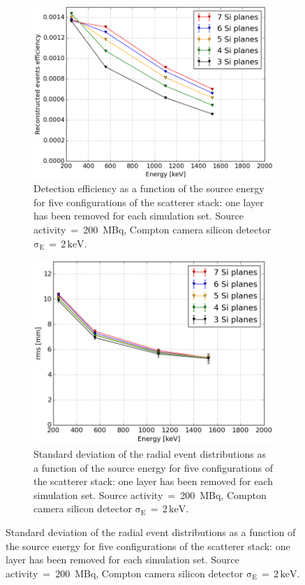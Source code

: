 \begin{figure}[h!]
\begin{subfigure}[t]{0.5\textwidth}
\centering
\includegraphics[width=.95\linewidth]{03_GraphicFiles/chapter5_SPECTsimu/SPECT/compton/geometry/effVSenergy_NSiplanes.png}
\caption{Detection efficiency as a function of the source energy for five configurations of the scatterer stack: one layer has been removed for each simulation set. Source activity~=~200~MBq, Compton camera silicon detector $\mathrm{\sigma_{E}\,=\,2\,keV}$.}
\label{chap5::fig::design_eff}
\end{subfigure}  
\begin{subfigure}[t]{.5\textwidth}
\centering
  \includegraphics[width=.95\linewidth]{03_GraphicFiles/chapter5_SPECTsimu/SPECT/compton/geometry/rmsVSenergy_NSiplanes.png}
  \caption{Standard deviation of the radial event distributions as a function of the source energy for five configurations of the scatterer stack: one layer has been removed for each simulation set. Source activity~=~200~MBq, Compton camera silicon detector $\mathrm{\sigma_{E}\,=\,2\,keV}$.}

\end{subfigure}
\end{figure}
